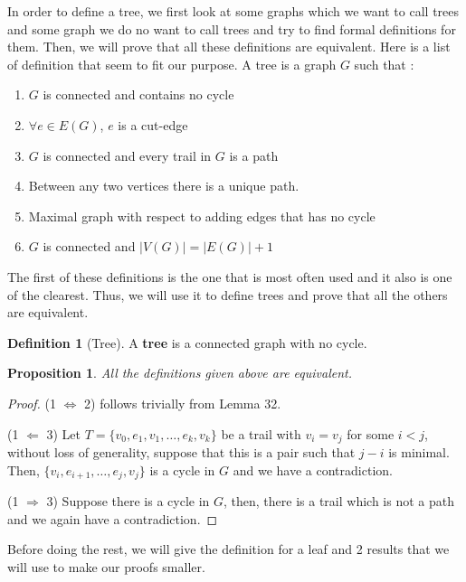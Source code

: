\documentclass{tufte-handout}
\newtheorem{prop}[thm]{Proposition}
\theoremstyle{definition}
\newtheorem{defn}[thm]{Definition}
\theoremstyle{remark}
\begin{document}
In order to define a tree, we first look at some graphs which we want to call trees and some graph we do no want to call trees and try to find formal definitions for them. Then, we will prove that all these definitions are equivalent.
Here is a list of definition that seem to fit our purpose. A tree is a graph $G$ such that :
\begin{enumerate}
	\item $G$ is connected and contains no cycle
	\item $\forall e \in E(G)$, $e$ is a cut-edge
	\item $G$ is connected and every trail in $G$ is a path
	\item Between any two vertices there is a unique path.
	\item Maximal graph with respect to adding edges that has no cycle
	\item $G$ is connected and $|V(G)| = |E(G)| + 1$ 
\end{enumerate}

The first of these definitions is the one that is most often used and it also is one of the clearest. Thus, we will use it to define trees and prove that all the others are equivalent.
\begin{defn}[Tree]
	A \textbf{tree} is a connected graph with no cycle. 
\end{defn}
\begin{prop}
	All the definitions given above are equivalent.
\end{prop}
\begin{proof}
	(1 $\Leftrightarrow$ 2) follows trivially from Lemma 32.
	
	(1 $\Leftarrow$ 3) Let $T = \{v_0, e_1, v_1, \dots, e_k, v_k\}$ be a trail with $v_i = v_j$ for some $i < j$, without loss of generality, suppose that this is a pair such that $j-i$ is minimal. Then, $\{v_i, e_{i+1}, \dots, e_j, v_j\}$ is a cycle in $G$ and we have a contradiction.
	
	(1 $\Rightarrow$ 3) Suppose there is a cycle in $G$, then, there is a trail which is not a path and we again have a contradiction.
\end{proof}
Before doing the rest, we will give the definition for a leaf and 2 results that we will use to make our proofs smaller.
\end{document}
